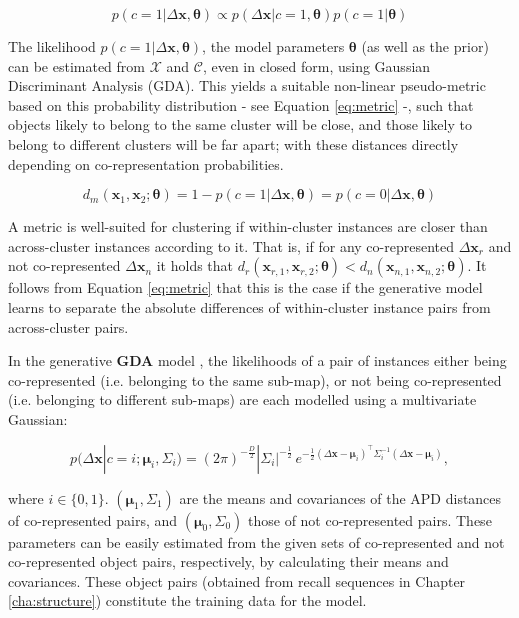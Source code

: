 \begin{equation}
\label{eq:linkprob}
p(c=1|\Delta \bm{x}, \bm{\theta}) \propto p(\Delta \bm{x} | c=1, \bm{\theta}) p(c=1|\bm{\theta})
\end{equation}

The likelihood $ p(c=1|\Delta \bm{x}, \bm{\theta}) $, the model parameters $ \bm{\theta} $ (as well as the prior) can be estimated from $\mathcal{X}$ and $\mathcal{C}$, even in closed form, using Gaussian Discriminant Analysis (GDA). This yields a suitable non-linear pseudo-metric based on this probability distribution - see Equation \ref{eq:metric} -, such that objects likely to belong to the same cluster will be close, and those likely to belong to different clusters will be far apart; with these distances directly depending on co-representation probabilities. 

\begin{equation}
\label{eq:metric}
d_m(\bm x_1, \bm x_2; \bm{\theta}) = 1 - p(c=1|\Delta \bm x, \bm{\theta}) = p(c=0|\Delta \bm x, \bm{\theta})
\end{equation}

A metric is well-suited for clustering if within-cluster instances are closer than across-cluster instances according to it. That is, if for any co-represented $\Delta \bm x_r$ and not co-represented $\Delta \bm x_n $ it holds that $ d_r(\bm x_{r,1}, \bm x_{r,2}; \bm{\theta}) < d_n(\bm x_{n,1}, \bm x_{n,2}; \bm{\theta}) $. It follows from Equation \ref{eq:metric} that this is the case if the generative model learns to separate the absolute differences of within-cluster instance pairs from across-cluster pairs.

In the generative \textbf{GDA} model \citep{bensmail1996regularized}, the likelihoods of a pair of instances either being co-represented (i.e. belonging to the same sub-map), or not being co-represented (i.e. belonging to different sub-maps) are each modelled using a multivariate Gaussian: 

\begin{equation}
\label{eq:mvnormal}
p( \Delta \bm x | c=i; \bm \mu_i, \Sigma_i) = (2\pi)^{-\frac{D}{2}}|\Sigma_i|^{-\frac{1}{2}}\, e^{ -\frac{1}{2}(\Delta \mathbf{x}-\bm\mu_i)^\intercal\Sigma_i^{-1}(\Delta \mathbf{x}-\bm\mu_i) },
\end{equation}

\noindent where $i \in \{0,1\}$. $(\bm \mu_1, \Sigma_1)$ are the means and covariances of the APD distances of co-represented pairs, and $(\bm \mu_0, \Sigma_0)$ those of not co-represented pairs. These parameters can be easily estimated from the given sets of co-represented and not co-represented object pairs, respectively, by calculating their means and covariances. These object pairs (obtained from recall sequences in Chapter \ref{cha:structure}) constitute the training data for the model.

